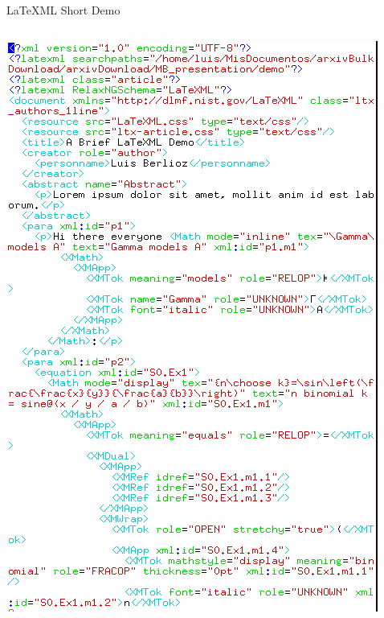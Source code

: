 \documentclass[9pt]{beamer}
\begin{document}
\begin{frame}{LaTeXML Short Demo}
\begin{columns}[T]
\begin{column}{0.5\textwidth}
    \includegraphics[width=\textwidth]{ltx_demo_output.png}
        \end{column}
    \end{columns}
\end{frame}
\end{document}
